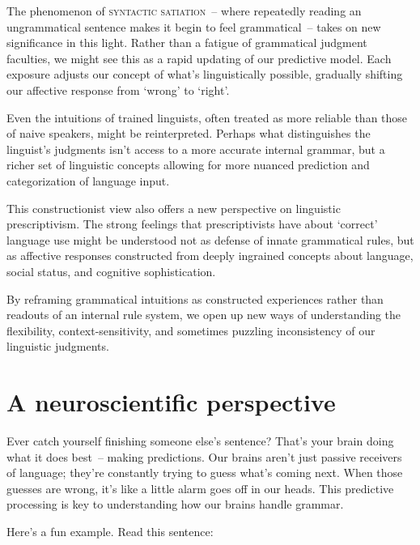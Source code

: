 The phenomenon of \textsc{syntactic satiation}~-- where repeatedly reading an ungrammatical sentence makes it begin to feel grammatical~-- takes on new significance in this light. Rather than a fatigue of grammatical judgment faculties, we might see this as a rapid updating of our predictive model. Each exposure adjusts our concept of what's linguistically possible, gradually shifting our affective response from `wrong' to `right'.

Even the intuitions of trained linguists, often treated as more reliable than those of naive speakers, might be reinterpreted. Perhaps what distinguishes the linguist's judgments isn't access to a more accurate internal grammar, but a richer set of linguistic concepts allowing for more nuanced prediction and categorization of language input.

This constructionist view also offers a new perspective on linguistic prescriptivism. The strong feelings that prescriptivists have about `correct' language use might be understood not as defense of innate grammatical rules, but as affective responses constructed from deeply ingrained concepts about language, social status, and cognitive sophistication.

By reframing grammatical intuitions as constructed experiences rather than readouts of an internal rule system, we open up new ways of understanding the flexibility, context-sensitivity, and sometimes puzzling inconsistency of our linguistic judgments.

\section{A neuroscientific perspective}

Ever catch yourself finishing someone else's sentence? That's your brain doing what it does best~-- making predictions. Our brains aren't just passive receivers of language; they're constantly trying to guess what's coming next. When those guesses are wrong, it's like a little alarm goes off in our heads. This predictive processing is key to understanding how our brains handle grammar.

Here's a fun example. Read this sentence:

\label{ex:moses}
\z

